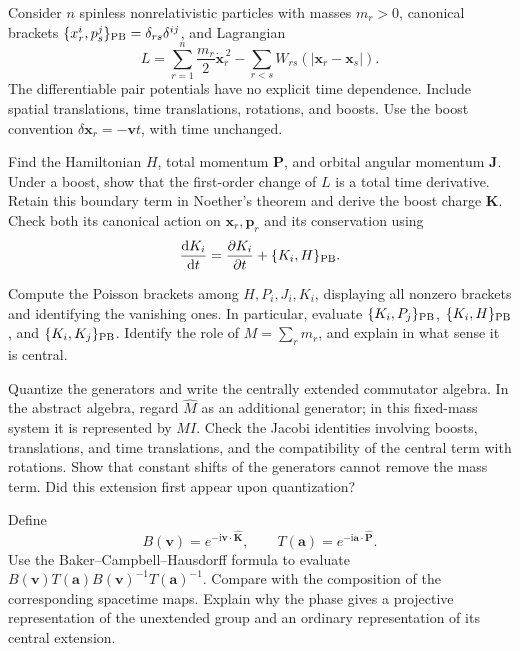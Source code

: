 \documentclass[11pt]{article}
\newcommand{\dd}{\mathrm{d}}
\newcommand{\ii}{\mathrm{i}}
\begin{document}
Consider \(n\) spinless nonrelativistic particles with masses \(m_r>0\),
canonical brackets \(\{x_r^i,p_s^j\}_{\rm PB}=\delta_{rs}\delta^{ij}\),
and Lagrangian
\begin{equation}
 L=\sum_{r=1}^{n}\frac{m_r}{2}\dot{\bm x}_r^{\,2}
   -\sum_{r<s}W_{rs}(|\bm x_r-\bm x_s|).
 \label{eq:galileanL}
\end{equation}
The differentiable pair potentials have no explicit time dependence.
Include spatial translations, time translations, rotations, and boosts.
Use the boost convention \(\delta\bm x_r=-\bm v t\), with time unchanged.

\begin{parts}
 \item Find the Hamiltonian \(H\), total momentum \(\bm P\), and orbital
 angular momentum \(\bm J\). Under a boost, show that the first-order
 change of \(L\) is a total time derivative. Retain this boundary term
 in Noether's theorem and derive the boost charge \(\bm K\).
 Check both its canonical action on \(\bm x_r,\bm p_r\) and its
 conservation using
 \begin{equation}
 \frac{\dd K_i}{\dd t}
 =\frac{\partial K_i}{\partial t}+\{K_i,H\}_{\rm PB}.
 \label{eq:explicitTime}
 \end{equation}

 \item Compute the Poisson brackets among \(H,P_i,J_i,K_i\), displaying
 all nonzero brackets and identifying the vanishing ones. In particular,
 evaluate \(\{K_i,P_j\}_{\rm PB}\), \(\{K_i,H\}_{\rm PB}\), and
 \(\{K_i,K_j\}_{\rm PB}\). Identify the role of
 \(M=\sum_r m_r\), and explain in what sense it is central.

 \item Quantize the generators and write the centrally extended
 commutator algebra. In the abstract algebra, regard \(\widehat M\) as
 an additional generator; in this fixed-mass system it is represented by
 \(M I\). Check the Jacobi identities involving boosts, translations,
 and time translations, and the compatibility of the central term with
 rotations. Show that constant shifts of the generators cannot remove
 the mass term. Did this extension first appear upon quantization?

 \item Define
 \begin{equation}
 B(\bm v)=e^{-\ii\bm v\cdot\widehat{\bm K}},\qquad
 T(\bm a)=e^{-\ii\bm a\cdot\widehat{\bm P}}.
 \end{equation}
 Use the Baker--Campbell--Hausdorff formula to evaluate
 \(B(\bm v)T(\bm a)B(\bm v)^{-1}T(\bm a)^{-1}\).
 Compare with the composition of the corresponding spacetime maps.
 Explain why the phase gives a projective representation of the
 unextended group and an ordinary representation of its central extension.
\end{parts}
\end{document}
